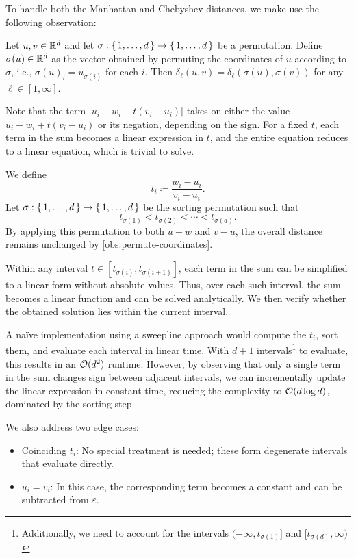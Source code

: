 To handle both the Manhattan and Chebyshev distances, we make use the following observation: 
\begin{observation}\label{obs:permute-coordinates}
  Let \(u, v \in \mathbb{R}^d\) and let \(\sigma: \set{1, \dots, d} \to \set{1, \dots, d}\) be a permutation. Define \(\sigma(u) \in \mathbb{R}^d\) as the vector obtained by permuting the coordinates of \(u\) according to \(\sigma\), i.e., \(\sigma(u)_i = u_{\sigma(i)}\) for each \(i\). Then \(\delta_\ell(u, v) = \delta_\ell(\sigma(u), \sigma(v))\) for any \(\ell \in [1, \infty]\).
\end{observation}

Note that the term \(|u_i - w_i + t (v_i - u_i )|\) takes on either the value \(u_i - w_i + t(v_i - u_i)\) or its negation, depending on the sign. For a fixed \(t\), each term in the sum becomes a linear expression in \(t\), and the entire equation reduces to a linear equation, which is trivial to solve. 

We define 
  \[t_i \coloneq \frac{w_i - u_i}{v_i - u_i}.\]
Let \(\sigma:\set{1,\dots, d} \to \set{1,\dots, d}\) be the sorting permutation such that 
  \[t_{\sigma(1)} < t_{\sigma(2)} < \cdots < t_{\sigma(d)}.\] 
By applying this permutation to both \(u-w\) and \(v -u\), the overall distance remains unchanged by \cref{obs:permute-coordinates}. 

Within any interval \(t \in [t_{\sigma(i)}, t_{\sigma(i+1)}]\), each term in the sum can be simplified to a linear form without absolute values. Thus, over each such interval, the sum becomes a linear function and can be solved analytically. We then verify whether the obtained solution lies within the current interval. 

A na\"ive implementation using a sweepline approach would compute the \(t_i\), sort them, and evaluate each interval in linear time. With \(d+1\) intervals\footnote{Additionally, we need to account for the intervals \((-\infty, t_{\sigma(1)}]\) and \([t_{\sigma(d)}, \infty)\)} to evaluate, this results in an \(\mathcal{O}(d^2)\) runtime. However, by observing that only a single term in the sum changes sign between adjacent intervals, we can incrementally update the linear expression in constant time, reducing the complexity to \(\mathcal{O}(d \log d)\), dominated by the sorting step. 

We also address two edge cases:
\begin{itemize}
	\item Coinciding \(t_i\): No special treatment is needed; these form degenerate intervals that evaluate directly.
	\item \(u_i = v_i\): In this case, the corresponding term becomes a constant and can be subtracted from \(\varepsilon\).
\end{itemize}

